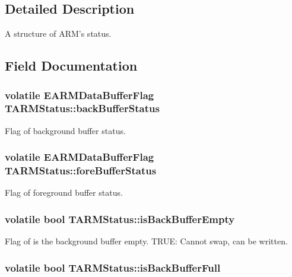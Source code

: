 \subsection{Detailed Description}
A structure of A\-R\-M's status. 

\subsection{Field Documentation}
\hypertarget{struct_t_a_r_m_status_a42242ba39c52a261a7a5a58ed5a6ab4e}{
\subsubsection[{back\-Buffer\-Status}]{\setlength{\rightskip}{0pt plus 5cm}volatile {\bf E\-A\-R\-M\-Data\-Buffer\-Flag} T\-A\-R\-M\-Status\-::back\-Buffer\-Status}}\label{struct_t_a_r_m_status_a42242ba39c52a261a7a5a58ed5a6ab4e}
Flag of background buffer status. \hypertarget{struct_t_a_r_m_status_a40d2f75b2786ab11ed853b7c98c8a223}{
\subsubsection[{fore\-Buffer\-Status}]{\setlength{\rightskip}{0pt plus 5cm}volatile {\bf E\-A\-R\-M\-Data\-Buffer\-Flag} T\-A\-R\-M\-Status\-::fore\-Buffer\-Status}}\label{struct_t_a_r_m_status_a40d2f75b2786ab11ed853b7c98c8a223}
Flag of foreground buffer status. \hypertarget{struct_t_a_r_m_status_a263f0e3cd78258d773d1ea15a972a3f9}{
\subsubsection[{is\-Back\-Buffer\-Empty}]{\setlength{\rightskip}{0pt plus 5cm}volatile bool T\-A\-R\-M\-Status\-::is\-Back\-Buffer\-Empty}}\label{struct_t_a_r_m_status_a263f0e3cd78258d773d1ea15a972a3f9}
Flag of is the background buffer empty. T\-R\-U\-E\-: Cannot swap, can be written. \hypertarget{struct_t_a_r_m_status_afe6a55dcf60e589bb4b7b184d3b1c970}{
\subsubsection[{is\-Back\-Buffer\-Full}]{\setlength{\rightskip}{0pt plus 5cm}volatile bool T\-A\-R\-M\-Status\-::is\-Back\-Buffer\-Full}}\label{struct_t_a_r_m_status_afe6a55dcf60e589bb4b7b184d3b1c970}

